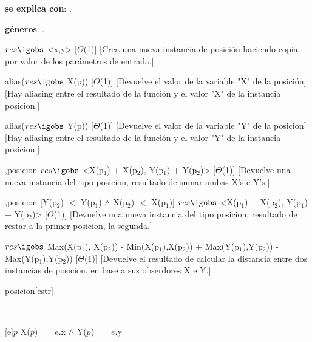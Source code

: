\begin{Interfaz}
	
	\textbf{se explica con}: .
	
	\textbf{géneros}: .
	
	
	{$res \igobs$ <x,y>}
	[$\Theta$(1)]
	[Crea una nueva instancia de posición haciendo copia por valor de los parámetros de entrada.]
	
	{alias($res \igobs$ X(p))}
	[$\Theta$(1)]
	[Devuelve el valor de la variable "X" de la posición]
	[Hay aliasing entre el resultado de la función y el valor "X" de la instancia posicion.]
	
	{alias($res \igobs$ Y(p))}
	[$\Theta$(1)]
	[Devuelve el valor de la variable "Y" de la posicion]
	[Hay aliasing entre el resultado de la función y el valor "Y" de la instancia posicion.]
	
	{,}{posicion}
	{$res \igobs$ <X(p$_1$) $+$ X(p$_2$), Y(p$_1$) $+$ Y(p$_2$)>}
	[$\Theta$(1)]
	[Devuelve una nueva instancia del tipo posicion, resultado de sumar ambas X's e Y's.]
	
	{,}{posicion}
	[Y(p$_2$) $<$ Y(p$_1$) $\land$ X(p$_2$) $<$ X(p$_1$)]
	{$res \igobs$ <X(p$_1$) $-$ X(p$_2$), Y(p$_1$) $-$ Y(p$_2$)>}
	[$\Theta$(1)]
	[Devuelve una nueva instancia del tipo posicion, resultado de restar a la primer posicion, la segunda.]
	
	{$res  \igobs$ Max(X(p$_1$), X(p$_2$)) - Min(X(p$_1$),X(p$_2$)) $+$ Max(Y(p$_1$),Y(p$_2$)) - Max(Y(p$_1$),Y(p$_2$)) }
	[$\Theta$(1)]
	[Devuelve el resultado de calcular la distancia entre dos instancias de posicion, en base a sus obserdores X e Y.]
	
\end{Interfaz}

\begin{Representacion}
	
	
	\begin{Estructura}{posicion}[estr]
		\begin{Tupla}[estr]
		\end{Tupla}
	\end{Estructura}
	
	
	~
	
	{$p$}
	{X($p$) $=$ $e$.x $\land$ Y($p$) $=$ $e$.y}
	
	
\end{Representacion}


